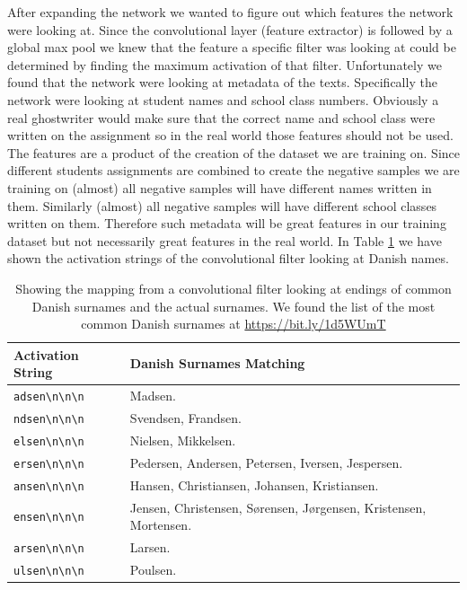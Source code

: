 After expanding the network we wanted to figure out which features the network
were looking at. Since the convolutional layer (feature extractor) is followed
by a global max pool we knew that the feature a specific filter was looking
at could be determined by finding the maximum activation of that filter.
Unfortunately we found that the network were looking at metadata of the texts.
Specifically the network were looking at student names and school class numbers.
Obviously a real ghostwriter would make sure that the correct name and school
class were written on the assignment so in the real world those features should
not be used. The features are a product of the creation of the dataset we are
training on. Since different students assignments are combined to create the
negative samples we are training on (almost) all negative samples will have
different names written in them. Similarly (almost) all negative samples will
have different school classes written on them. Therefore such metadata will be
great features in our training dataset but not necessarily great features in
the real world. In Table \ref{tab:name_features} we have shown the activation
strings of the convolutional filter looking at Danish names.

\begin{table}
    \begin{tabular}{ll}
        \textbf{Activation String} & \textbf{Danish Surnames Matching} \\
        \hline
        \verb!adsen\n\n\n! & Madsen. \\
        \verb!ndsen\n\n\n! & Svendsen, Frandsen. \\
        \verb!elsen\n\n\n! & Nielsen, Mikkelsen. \\
        \verb!ersen\n\n\n! & Pedersen, Andersen, Petersen, Iversen, Jespersen. \\
        \verb!ansen\n\n\n! & Hansen, Christiansen, Johansen, Kristiansen. \\
        \verb!ensen\n\n\n! & Jensen, Christensen, S\o rensen, J\o rgensen,
                             Kristensen, Mortensen. \\
        \verb!arsen\n\n\n! & Larsen. \\
        \verb!ulsen\n\n\n! & Poulsen.
    \end{tabular}
    \caption{Showing the mapping from a convolutional filter looking at endings
        of common Danish surnames and the actual surnames. We found the list of
        the most common Danish surnames at \url{https://bit.ly/1d5WUmT}}
    \label{tab:name_features}
\end{table}

